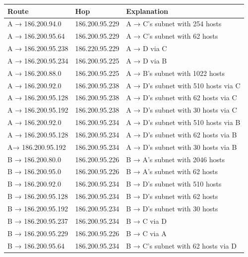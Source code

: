 \documentclass[a4paper, titlepage,12pt]{article}
\begin{document}
			\begin{center}
		\begin{longtable}{|l|l|l|}

			\hline
			\textbf{Route} & \textbf{Hop} & \textbf{Explanation} \\
			\hline
			A → 186.200.94.0 & 186.200.95.229 & A →  C’s subnet with 254 hosts \\
			\hline
			A → 186.200.95.64 & 186.200.95.229 & A →  C’s subnet with 62 hosts \\
			\hline
			A → 186.200.95.238 & 186.220.95.229 & A →  D via C  \\
			\hline
			A → 186.200.95.234 & 186.200.95.225 & A →  D via B  \\
			\hline
			A → 186.200.88.0 & 186.200.95.225 & A →  B’s subnet with 1022 hosts \\
			\hline
			A → 186.200.92.0 & 186.200.95.238 & A →  D’s subnet with 510 hosts via C \\
			\hline
			A → 186.200.95.128 & 186.200.95.238 & A →  D’s subnet with 62 hosts via C \\
			\hline
			A → 186.200.95.192 & 186.200.95.238 & A →  D’s subnet with 30 hosts via C \\
			\hline
			A → 186.200.92.0 & 186.200.95.234 & A →  D’s subnet with 510 hosts via B \\
			\hline
			A → 186.200.95.128 & 186.200.95.234 & A →  D’s subnet with 62 hosts via B \\
			\hline
			A→ 186.200.95.192 & 186.200.95.234 & A →  D’s subnet with 30 hosts via B  \\
			\hline
			B → 186.200.80.0 & 186.200.95.226 & B →  A’s subnet with 2046 hosts \\
			\hline
			B → 186.200.95.0 & 186.200.95.226 & B →  A’s subnet with 62 hosts \\
			\hline
			B → 186.200.92.0 & 186.200.95.234 & B →  D’s subnet with 510 hosts \\
			\hline
			B → 186.200.95.128 & 186.200.95.234 & B →  D’s subnet with 62 hosts \\
			\hline
			B → 186.200.95.192 & 186.200.95.234 & B →  D’s subnet with 30 hosts \\
			\hline
			B → 186.200.95.237 & 186.200.95.234 & B →  C via D \\
			\hline
			B → 186.200.95.229 & 186.200.95.226 & B →  C via A \\
			\hline
			B → 186.200.95.64 & 186.200.95.234 & B →  C’s subnet with 62 hosts via D \\

\end{longtable}
\end{center}
\end{document}
